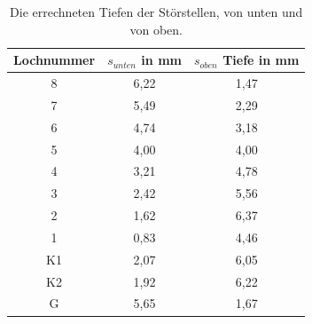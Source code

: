 \begin{table}[h]
    \centering
    \caption{Die errechneten Tiefen der Störstellen, von unten und von oben.}
    \begin{tabular}{ccc}
      \toprule
      {Lochnummer} & 
      {$s_{unten}$ in mm} &
      {$s_{oben}$ Tiefe in mm} \\
      \midrule
      8  &  6,22  & 1,47  \\
      7  &  5,49  & 2,29  \\
      6  &  4,74  & 3,18  \\
      5  &  4,00  & 4,00  \\
      4  &  3,21  & 4,78  \\
      3  &  2,42  & 5,56  \\
      2  &  1,62  & 6,37  \\
      1  &  0,83  & 4,46  \\
      K1 &  2,07  & 6,05  \\
      K2 &  1,92  & 6,22  \\   
      G  &  5,65  & 1,67  \\
      \bottomrule
    \end{tabular}
 \label{tab:tiefe}
\end{table}
\noindent


